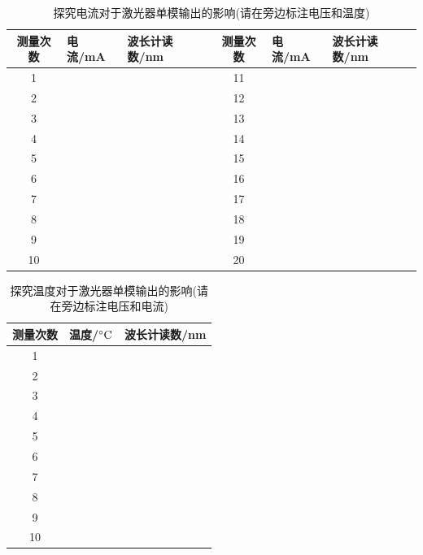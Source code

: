 \documentclass[10pt,a4paper]{ctexart}
\begin{document}
\begin{table}[H]
\begin{center}
    \caption{探究电流对于激光器单模输出的影响(请在旁边标注电压和温度)}
    \begin{tabular}{|c|l|l|c|l|l|}
\hline
测量次数 & 电流/mA & 波长计读数/nm &测量次数 & 电流/mA & 波长计读数/nm \\ \hline
1    &       &  &11    &       &          \\ \hline
2    &       &   &12    &       &         \\ \hline
3    &       &     &13    &       &       \\ \hline
4    &       &       &14    &       &     \\ \hline
5    &       &   &15    &       &         \\ \hline
6    &       &   &16    &       &         \\ \hline
7    &       &   &17    &       &         \\ \hline
8    &       &   &18    &       &         \\ \hline
9    &       &   &19    &       &         \\ \hline
10   &       &   &20    &       &         \\ \hline
\end{tabular}
\end{center}
\end{table}

\begin{table}[H]
\begin{center}
    \caption{探究温度对于激光器单模输出的影响(请在旁边标注电压和电流)}
    \begin{tabular}{|c|l|l|}
\hline
测量次数 & 温度/$^\circ {\rm C}$ & 波长计读数/nm \\ \hline
1    &       &          \\ \hline
2    &       &          \\ \hline
3    &       &          \\ \hline
4    &       &          \\ \hline
5    &       &          \\ \hline
6    &       &          \\ \hline
7    &       &          \\ \hline
8    &       &          \\ \hline
9    &       &          \\ \hline
10   &       &          \\ \hline
\end{tabular}
\end{center}
\end{table}
\end{document}
